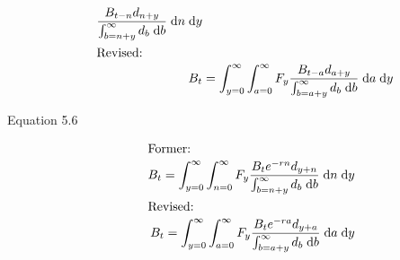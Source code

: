 \documentclass{article}
\newcommand{\dd}{\; \mathrm{d}}
\begin{document}
\begin{description}
\begin{align}
\frac{B_{t-n}d_{n+y}}{\int_{b=n+y}^\infty d_b \dd b} \dd n \dd y \notag\\
\intertext{Revised:}
B_t &= \int_{y=0}^\infty \int_{a=0}^\infty F_y
\frac{B_{t-a}d_{a+y}}{\int_{b=a+y}^\infty d_b \dd b} \dd a \dd y \notag
\end{align}
\item[Equation 5.6]
\begin{align}
\intertext{Former:}
B_t = \int_{y=0}^\infty \int_{n=0}^\infty F_y
\frac{B_{t}e^{-rn}d_{y+n}}{\int_{b=n+y}^\infty d_b \dd b} \dd n \dd y \notag\\
\intertext{Revised:}
B_t = \int_{y=0}^\infty \int_{a=0}^\infty F_y
\frac{B_{t}e^{-ra}d_{y+a}}{\int_{b=a+y}^\infty d_b \dd b} \dd a \dd y \notag
\end{align}
\end{description}
\end{document}
